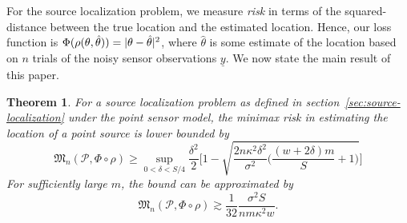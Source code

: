 \documentclass[conference]{IEEEtran}
\providecommand{\v}{}
\renewcommand{\v}[1]{\underline{#1}}
\DeclarePairedDelimiter\abs{\lvert}{\rvert}
\newcommand{\Phiorho}{\Phi\!\circ\!\rho}
\newtheorem{theorem}{Theorem}
\begin{document}
For the source localization problem, we measure \emph{risk} in terms of the
squared-distance between the true location and the estimated location. Hence,
our loss function is $\Phi(\rho(\theta, \hat\theta)) = \abs{\theta -
\hat\theta}^2$, where $\hat\theta$ is some estimate of the location based on
$n$ trials of the noisy sensor observations $\v y$. We now state the main
result of this paper.
\begin{theorem} \label{thm:main-lb}
	For a source localization problem as defined in
	section~\ref{sec:source-localization} under the point sensor model, the
	minimax risk in estimating the location of a point source is lower bounded
	by
	\begin{equation*}
		\mathfrak{M}_n(\mathcal{P}, \Phi\circ\rho) \geq \sup_{0 < \delta < S/4} \frac{\delta^2}{2} \Bigg[1 - \sqrt{\frac{2n \kappa^2 \delta^2}{\sigma^2}\bigg(\!\frac{(w{+}2\delta) m}{S} + 1\!\bigg)} \Bigg]
	\end{equation*}
	For sufficiently large $m$, the bound can be approximated by
	\begin{equation} \label{eq:main-lower-bound}
		\mathfrak{M}_n(\mathcal{P}, \Phiorho) \gtrsim \frac{1}{32} \frac{\sigma^2 S}{nm\kappa^2w}.
	\end{equation}
\end{theorem}%
\end{document}
